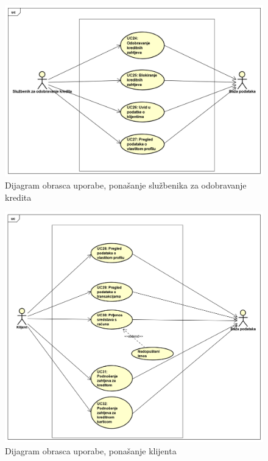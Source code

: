 	        	\begin{figure}[H]
		        	\includegraphics[scale=0.6]{slike/UseCase OdobravanjeKredita Marko.png}
		        	\centering
		        	\caption{Dijagram obrasca uporabe, ponašanje službenika za odobravanje kredita}
		        	\label{fig:službenik_kredit}
	        	\end{figure}
			    
			    \begin{figure}[H]
			    	\includegraphics[scale=0.55]{slike/UseCase Klijent Marko.png}
			    	\centering
			    	\caption{Dijagram obrasca uporabe, ponašanje klijenta}
			    	\label{fig:klijent}
			    \end{figure}
		    
